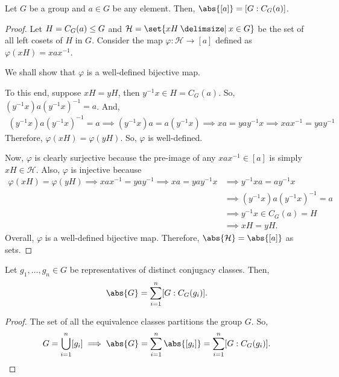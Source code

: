 \documentclass[11pt]{penrose}
\begin{document}
\begin{nthm}
    Let $G$ be a group and $a \in G$ be any element. Then, $\abs{[a]} = [G : C_{G}(a)]$.
\end{nthm}
\begin{proof}
    Let $H = C_{G}(a) \mathrel{\leq} G$ and $\mathcal{H} = \set{xH \st x \in G}$ be the set of all left cosets of $H$ in $G$. Consider the map $\varphi : \mathcal{H} \to [a]$ defined as $\varphi(xH) = x a x^{-1}$.

    We shall show that $\varphi$ is a well-defined bijective map.

    To this end, suppose $xH = yH$, then $y^{-1} x \in H = C_{G}(a)$. So, $(y^{-1} x) a (y^{-1} x)^{-1} = a$. And,
    \begin{align*}
        (y^{-1} x) a (y^{-1} x)^{-1} = a
        \implies
        (y^{-1} x) a = a (y^{-1} x)
        \implies
        xa = yay^{-1} x
        \implies
        xax^{-1} = yay^{-1}
    \end{align*}
    Therefore, $\varphi(xH) = \varphi(yH)$. So, $\varphi$ is well-defined.

    Now, $\varphi$ is clearly surjective because the pre-image of any $x a x^{-1} \in [a]$ is simply $xH \in \mathcal{H}$. Also, $\varphi$ is injective because
    \begin{align*}
        \varphi(xH) = \varphi(yH)
        \implies
        xax^{-1} = yay^{-1}
        \implies
        xa = yay^{-1} x
        &\implies
        y^{-1} x a = a y^{-1} x\\
        &\implies
        (y^{-1} x) a (y^{-1} x)^{-1} = a\\
        &\implies
        y^{-1} x \in C_{G}(a) = H\\
        &\implies
        xH = yH.
    \end{align*}
    Overall, $\varphi$ is a well-defined bijective map. Therefore, $\abs{ \mathcal{H} } = \abs{ [a] }$ as sets.
\end{proof}

\begin{nthm}
    Let $g_{1}, \dots, g_{n} \in G$ be representatives of distinct conjugacy classes. Then,
    \begin{equation*}
        \abs{G} = \sum_{i=1}^{n} [G : C_{G}(g_{i})].
    \end{equation*}
\end{nthm}
\begin{proof}
    The set of all the equivalence classes partitions the group $G$. So,
    \begin{equation*}
        G = \bigcup_{i = 1}^{n} [g_{i}]
        \implies \abs{G} = \sum_{i = 1}^{n} \abs{[g_{i}]} = \sum_{i = 1}^{n} [G : C_{G}(g_{i})].
        \qedhere
    \end{equation*}
\end{proof}
\end{document}
